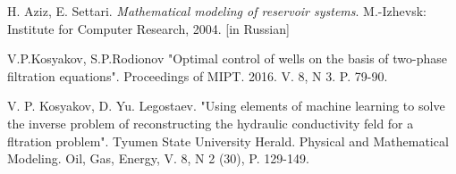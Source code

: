 \documentclass{article}
\begin{document}
\begin{thebibliography}{20}
 H. Aziz, E. Settari. \textit{Mathematical modeling of reservoir systems}.  M.-Izhevsk: Institute for Computer Research, 2004. [in Russian]

 V.P.Kosyakov, S.P.Rodionov "Optimal control of wells on the basis of two-phase filtration equations". Proceedings of MIPT. 2016. V. 8, N 3. P. 79-90.

 V. P. Kosyakov,  D. Yu. Legostaev. "Using elements of machine learning to
solve the inverse problem of reconstructing the hydraulic conductivity feld for a fltration
problem". Tyumen State University Herald. Physical and Mathematical Modeling. Oil, Gas,
Energy, V. 8, N 2 (30), P. 129-149.

\end{thebibliography}
\end{document}
